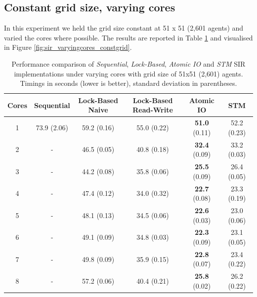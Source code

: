 \subsection{Constant grid size, varying cores}
In this experiment we held the grid size constant at 51 x 51 (2,601 agents) and varied the cores where possible. The results are reported in Table \ref{tab:sir_varyingcores_constgrid} and visualised in Figure \ref{fig:sir_varyingcores_constgrid}.

\begin{table}
	\centering
	\begin{adjustbox}{width=1\textwidth}
  	\begin{tabular}{ c || c | c | c | c | c }
        Cores & Sequential  & Lock-Based Naive & Lock-Based Read-Write & Atomic IO             & STM          \\ \hline \hline 
   		1     & 73.9 (2.06) & 59.2 (0.16)      & 55.0 (0.22)           & \textbf{51.0} (0.11)  & 52.2 (0.23)  \\ \hline
   		2     & -           & 46.5 (0.05)      & 40.8 (0.18)           & \textbf{32.4} (0.09)  & 33.2 (0.03)  \\ \hline
   		3     & -           & 44.2 (0.08)      & 35.8 (0.06)           & \textbf{25.5} (0.09)  & 26.4 (0.05)  \\ \hline
   		4     & -           & 47.4 (0.12)      & 34.0 (0.32)           & \textbf{22.7} (0.08)  & 23.3 (0.19)  \\ \hline
   		5     & -           & 48.1 (0.13)      & 34.5 (0.06)           & \textbf{22.6} (0.03)  & 23.0 (0.06)  \\ \hline
   		6     & -           & 49.1 (0.09)      & 34.8 (0.03)           & \textbf{22.3} (0.09)  & 23.1 (0.05)  \\ \hline
   		7     & -           & 49.8 (0.09)      & 35.9 (0.15)           & \textbf{22.8} (0.07)  & 23.4 (0.22)  \\ \hline
   		8     & -           & 57.2 (0.06)      & 40.4 (0.21)           & \textbf{25.8} (0.02)  & 26.2 (0.22)  \\ \hline \hline
  	\end{tabular}
	\end{adjustbox}
	
  	\caption{Performance comparison of \textit{Sequential}, \textit{Lock-Based}, \textit{Atomic IO} and \textit{STM} SIR implementations under varying cores with grid size of 51x51 (2,601) agents. Timings in seconds (lower is better), standard deviation in parentheses.}
	\label{tab:sir_varyingcores_constgrid}
\end{table}

